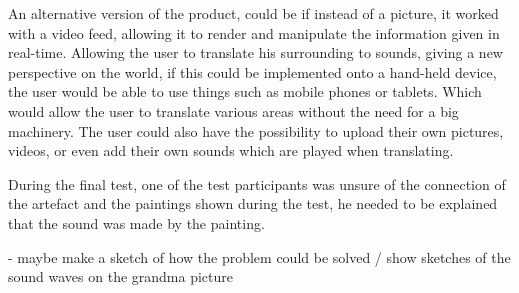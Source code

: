 An alternative version of the product, could be if instead of a picture, it worked with a video feed, allowing it to render and manipulate the information given in real-time. Allowing the user to translate his surrounding to sounds, giving a new perspective on the world, if this could be implemented onto a hand-held device, the user would be able to use things such as mobile phones or tablets. Which would allow the user to translate various areas without the need for a big machinery. 
The user could also have the possibility to upload their own pictures, videos, or even add their own sounds which are played when translating. 



During the final test, one of the test participants was unsure of the connection of the artefact and the paintings shown during the test, he needed to be explained that the sound was made by the painting. 
 
 - maybe make a sketch of how the problem could be solved / show sketches of the sound waves on the grandma picture 
